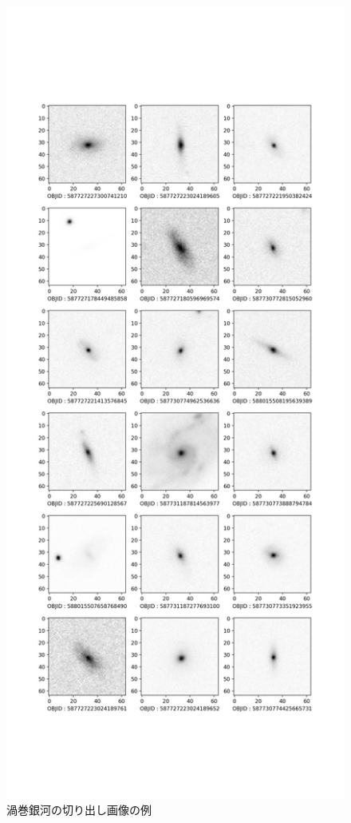 \documentclass[a4j, 11pt]{jreport}
\begin{document}
\newpage
\begin{figure}[H]
 \centering
 \includegraphics[width=0.6\vsize, keepaspectratio]{images/syuron_4syou_sdss_imgs/spiral.png}
 \caption{渦巻銀河の切り出し画像の例}
 \label{fig:sdss_images_spiral}
\end{figure}
\end{document}
